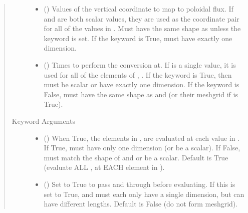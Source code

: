 \documentclass[letterpaper,10pt,english]{sphinxmanual}
\begin{document}
\begin{fulllineitems}
\begin{fulllineitems}
\begin{quote}
\begin{description}
\begin{itemize}
\item {} 
 () \textendash{} Values of the vertical coordinate to
map to poloidal flux. If  and  are both scalar values,
they are used as the coordinate pair for all of the values in
. Must have the same shape as  unless the 
keyword is set. If the  keyword is True,  must
have exactly one dimension.

\item {} 
 () \textendash{} Times to perform the conversion at.
If  is a single value, it is used for all of the elements of
, . If the  keyword is True, then  must be
scalar or have exactly one dimension. If the  keyword is
False,  must have the same shape as  and  (or their
meshgrid if  is True).

\end{itemize}

\item[{Keyword Arguments}] \leavevmode\begin{itemize}
\item {} 
 () \textendash{} When True, the elements in ,  are evaluated
at each value in . If True,  must have only one dimension
(or be a scalar). If False,  must match the shape of  and
 or be a scalar. Default is True (evaluate ALL ,  at
EACH element in ).

\item {} 
 () \textendash{} Set to True to pass  and  through
 before evaluating. If this is set to
True,  and  must each only have a single dimension, but
can have different lengths. Default is False (do not form
meshgrid).


\end{itemize}
\end{description}
\end{quote}
\end{fulllineitems}
\end{fulllineitems}
\end{document}
